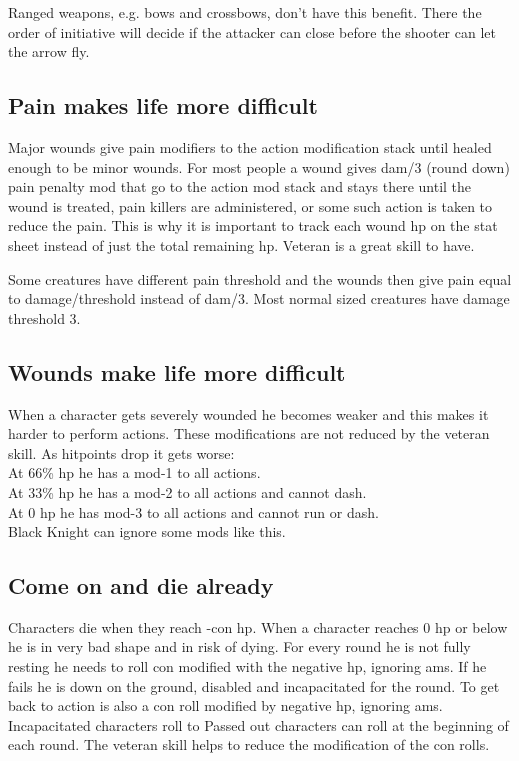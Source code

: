 Ranged weapons, e.g. bows and crossbows, don't have this benefit. There the order of initiative will decide if the attacker can close before the shooter can let the arrow fly.


\subsection*{Pain makes life more difficult}
Major wounds give pain modifiers to the action modification stack until healed enough to be minor wounds.
For most people a wound gives dam/3 (round down) pain penalty mod that go to the action mod stack and stays there until the wound is treated, pain killers are administered, or some such action is taken to reduce the pain. This is why it is important to track each wound hp on the stat sheet instead of just the total remaining hp.
Veteran is a great skill to have.

Some creatures have different pain threshold and the wounds then give pain equal to damage/threshold instead of dam/3. Most normal sized creatures have damage threshold 3.


\subsection*{Wounds make life more difficult}
When a character gets severely wounded he becomes weaker and this makes it harder to perform actions. These modifications are not reduced by the veteran skill. As hitpoints drop it gets worse:\\
At 66\% hp he has a mod-1 to all actions. \\
At 33\% hp he has a mod-2 to all actions and cannot dash. \\
At 0 hp he has mod-3 to all actions and cannot run or dash.\\
Black Knight can ignore some mods like this.


\subsection*{Come on and die already}
Characters die when they reach -con hp. When a character reaches 0 hp or below he is in very bad shape and in risk of dying. For every round he is not fully resting he needs to roll con modified with the negative hp, ignoring ams. If he fails he is down on the ground, disabled and incapacitated for the round. To get back to action is also a con roll modified by negative hp, ignoring ams.
Incapacitated characters roll to
Passed out characters can roll at the beginning of each round. The veteran skill helps to reduce the modification of the con rolls.

